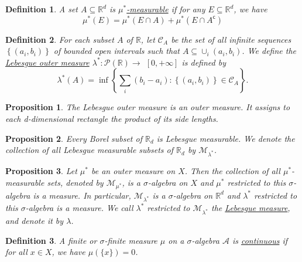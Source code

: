 \documentclass[12pt]{article}
\newtheorem{definition}{Definition}[section]
\newtheorem{proposition}{Proposition}[section]
\begin{document}
\begin{definition}
	A set $A \subseteq \mathbb{R}^d$ is \underline{$\mu^*$-measurable} if for any $E \subseteq \mathbb{R}^d$, we have
	\begin{equation*}
		\mu^*(E) = \mu^*(E \cap A) + \mu^*(E \cap A^\mathsf{c})
	\end{equation*}
\end{definition}

\begin{definition}
	For each subset $A$ of $\mathbb{R}$, let $\mathcal{C}_A$ be the set of all infinite sequences $\left\{\left(a_i, b_i\right)\right\}$ of bounded open intervals such that $A \subseteq \cup_i\left(a_i, b_i\right)$.
	We define the \underline{Lebesgue outer measure} $\lambda^*: \mathcal{P}(\mathbb{R}) \rightarrow$ $[0,+\infty]$ is defined by
	$$
	\lambda^*(A)=\inf \left\{\sum_i\left(b_i-a_i\right):\left\{\left(a_i, b_i\right)\right\} \in \mathcal{C}_A\right\} .
	$$
\end{definition}

\begin{proposition}
	The Lebesgue outer measure is an outer measure. It assigns to each d-dimensional rectangle the product of its side lengths.
\end{proposition}

\begin{proposition}
	Every Borel subset of $\mathbb{R}_d$ is Lebesgue measurable. We denote the collection of all Lebesgue measurable subsets of $\mathbb{R}_d$ by $\mathcal{M}_{\lambda^*}$.
\end{proposition}


\begin{proposition}
	Let $\mu^*$ be an outer measure on $X$. Then the collection of all $\mu^*$-measurable sets, denoted by $\mathcal{M}_{\mu^*}$, is a $\sigma$-algebra on $X$ and $\mu^*$ restricted to this $\sigma$-algebra is a measure.
	In particular, $\mathcal{M}_{\lambda^*}$ is a $\sigma$-algebra on $\mathbb{R}^d$ and $\lambda^*$ restricted to this $\sigma$-algebra is a measure. We call $\lambda^*$ restricted to $\mathcal{M}_{\lambda^*}$ the \underline{Lebesgue measure}, and denote it by $\lambda$.
\end{proposition}

\begin{definition}
	A finite or $\sigma$-finite measure $\mu$ on a $\sigma$-algebra $\mathcal{A}$ is \underline{continuous} if for all $x\in X$, we have $\mu(\{x\}) = 0$.
\end{definition}
\end{document}

